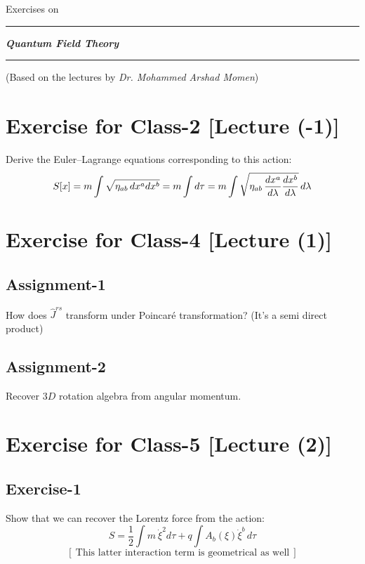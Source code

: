\documentclass[14pt]{article} %
\begin{document}
\begin{titlepage}
    \centering
    \vspace*{3cm}
    {Exercises on \par}
    \vspace{1cm}
    \hrule
    \vspace{1cm}
    {\huge \textit{\textbf{Quantum Field Theory}} \par}
    \vspace{1cm}
    \hrule
    \vspace{1cm}
    \small
   (Based on the lectures by \textit{Dr. Mohammed Arshad Momen})
\vspace{3cm}
\end{titlepage}
\tableofcontents
\newpage
\section{Exercise for Class-2 [Lecture (-1)]}
Derive the Euler–Lagrange equations corresponding to this action:
\[
S[x] = m \int \sqrt{ \eta_{ab} \, dx^a dx^b }=m \int d \tau \\
    = m \int \sqrt{ \eta_{ab} \, \frac{dx^a}{d\lambda} \frac{dx^b}{d\lambda} } \, d\lambda
\]
\section{Exercise for Class-4 [Lecture (1)]}
\subsection{Assignment-1}
How does $\hat{J}^{rs}$ transform under Poincaré transformation? (It's a semi direct product)

\subsection{Assignment-2}
Recover $3D$ rotation algebra from angular momentum.

\section{Exercise for Class-5 [Lecture (2)]}
\subsection{Exercise-1}
Show that we can recover the Lorentz force from the action:
\[
S = \frac{1}{2} \int m~ \dot{\xi}^2 d\tau + q \int A_b(\xi) \dot{\xi}^b \, d\tau
\]
\[
\left[~\text{This latter interaction term is geometrical as well}~\right]
\]
\end{document}
